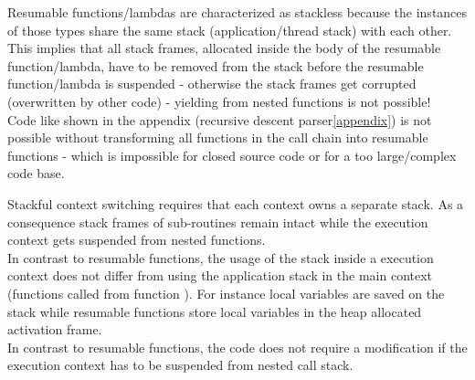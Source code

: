 \label{stackless}
Resumable functions/lambdas are characterized as stackless because the instances
of those types share the same stack (application/thread stack) with each other.\\
This implies that all stack frames, allocated inside the body of the resumable
function/lambda, have to be removed from the stack before the resumable
function/lambda is suspended - otherwise the stack frames get corrupted
(overwritten by other code) - yielding from nested functions is not possible!\\
Code like shown in the appendix (recursive descent parser\ref{appendix}) is not
possible without transforming all functions in the call chain into resumable
functions - which is impossible for closed source code or for a too
large/complex code base.

Stackful context switching requires that each context owns a separate stack.
As a consequence stack frames of sub-routines remain intact while the execution
context gets suspended from nested functions.\\
In contrast to resumable functions, the usage of the stack inside a execution
context does not differ from using the application stack in the main context
(functions called from function \main). For instance local variables are saved
on the stack while resumable functions store local variables in the heap
allocated activation frame.\\
In contrast to resumable functions, the code does not require a modification if
the execution context has to be suspended from nested call stack.

